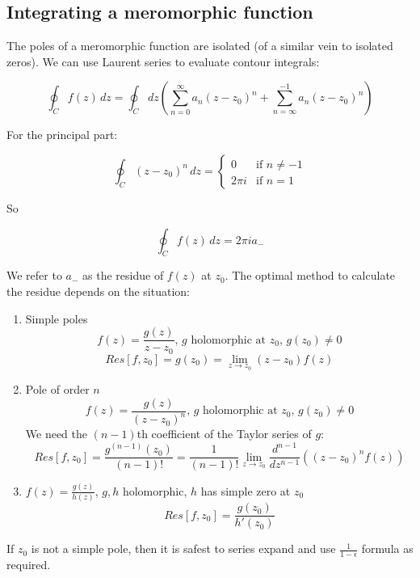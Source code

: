 \documentclass{../../physics_notes}
\begin{document}
\subsection{Integrating a meromorphic function }\label{sec:evaluating_poles}

The poles of a meromorphic function are isolated (of a similar vein to isolated zeros). We can use Laurent series to evaluate contour integrals:

\[ \oint_C f(z)\, dz = \oint_C dz \left(\sum_{n=0}^\infty a_n (z-z_0)^n + \sum_{n=\infty}^{-1} a_n (z-z_0)^n \right) \]

For the principal part:

\[ \oint_C (z-z_0)^n \, dz = \begin{cases} 0 & \mbox{if } n\neq -1 \\ 2\pi i & \mbox{if } n = 1 \end{cases}\]

So 

\begin{equation}
\oint_C f(z)\, dz = 2\pi i a_{-}
\end{equation} 

We refer to $a_{-}$ as the residue of $f(z)$ at $z_0$. The optimal method to calculate the residue depends on the situation:

\begin{enumerate}[label=\alph*)]
\item{Simple poles \[ f(z) = \frac{g(z)}{z - z_0} \text{, $g$ holomorphic at $z_0$, $g(z_0) \neq 0$}\] \[ Res[f, z_0] = g(z_0) = \lim_{z\to z_0} (z - z_0)f(z) \]}
\item{Pole of order $n$ \[ f(z) = \frac{g(z)}{(z - z_0)^n} \text{, $g$ holomorphic at $z_0$, $g(z_0) \neq 0$}\] We need the $(n-1)$th coefficient of the Taylor series of $g$: \[ Res[f, z_0] = \frac{g^{(n-1)} (z_0)}{(n-1)!} = \frac{1}{(n-1)!}\lim_{z\to z_0} \frac{d^{n-1}}{dz^{n-1}}\left( (z - z_0)^n f(z)\right) \]}
\item{$f(z) = \frac{g(z)}{h(z)}$, $g,h$ holomorphic, $h$ has simple zero at $z_0$ \[ Res[f, z_0] = \frac{g(z_0)}{h'(z_0)}\]}
\end{enumerate}

If $z_0$ is not a simple pole, then it is safest to series expand and use $\frac{1}{1-\epsilon}$ formula as required.
\end{document}
